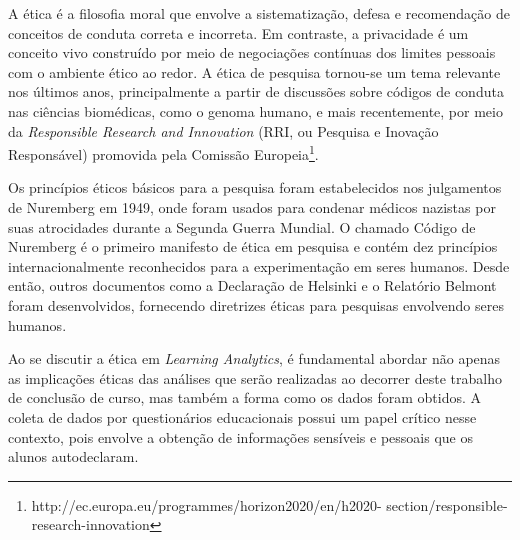 A ética é a filosofia moral que envolve a sistematização, defesa e recomendação de conceitos de conduta correta e incorreta. Em contraste, a privacidade é um conceito vivo construído por meio de negociações contínuas dos limites pessoais com o ambiente ético ao redor. A ética de pesquisa tornou-se um tema relevante nos últimos anos, principalmente a partir de discussões sobre códigos de conduta nas ciências biomédicas, como o genoma humano, e mais recentemente, por meio da \textit{Responsible Research and Innovation} (RRI, ou Pesquisa e Inovação Responsável) promovida pela Comissão Europeia\footnote{http://ec.europa.eu/programmes/horizon2020/en/h2020-
section/responsible-research-innovation}.

Os princípios éticos básicos para a pesquisa foram estabelecidos nos julgamentos de Nuremberg em 1949, onde foram usados para condenar médicos nazistas por suas atrocidades durante a Segunda Guerra Mundial. O chamado Código de Nuremberg é o primeiro manifesto de ética em pesquisa e contém dez princípios internacionalmente reconhecidos para a experimentação em seres humanos. Desde então, outros documentos como a Declaração de Helsinki \cite{Helsinki} e o Relatório Belmont \cite{belmont} foram desenvolvidos, fornecendo diretrizes éticas para pesquisas envolvendo seres humanos.



Ao se discutir a ética em \textit{Learning Analytics}, é fundamental abordar não apenas as implicações éticas das análises que serão realizadas ao decorrer deste trabalho de conclusão de curso, mas também a forma como os dados foram obtidos. A coleta de dados por questionários educacionais possui um papel crítico nesse contexto, pois envolve a obtenção de informações sensíveis e pessoais que os alunos autodeclaram.

